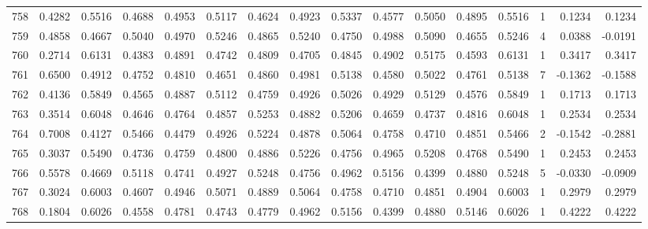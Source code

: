 \begin{tabular}{lrrrrrrrrrrrrrrr}
758 &      0.4282 &  0.5516 &  0.4688 &  0.4953 &  0.5117 &  0.4624 &  0.4923 &  0.5337 &  0.4577 &  0.5050 &   0.4895 &     0.5516 &      1 &                    0.1234 &                     0.1234 \\
759 &      0.4858 &  0.4667 &  0.5040 &  0.4970 &  0.5246 &  0.4865 &  0.5240 &  0.4750 &  0.4988 &  0.5090 &   0.4655 &     0.5246 &      4 &                    0.0388 &                    -0.0191 \\
760 &      0.2714 &  0.6131 &  0.4383 &  0.4891 &  0.4742 &  0.4809 &  0.4705 &  0.4845 &  0.4902 &  0.5175 &   0.4593 &     0.6131 &      1 &                    0.3417 &                     0.3417 \\
761 &      0.6500 &  0.4912 &  0.4752 &  0.4810 &  0.4651 &  0.4860 &  0.4981 &  0.5138 &  0.4580 &  0.5022 &   0.4761 &     0.5138 &      7 &                   -0.1362 &                    -0.1588 \\
762 &      0.4136 &  0.5849 &  0.4565 &  0.4887 &  0.5112 &  0.4759 &  0.4926 &  0.5026 &  0.4929 &  0.5129 &   0.4576 &     0.5849 &      1 &                    0.1713 &                     0.1713 \\
763 &      0.3514 &  0.6048 &  0.4646 &  0.4764 &  0.4857 &  0.5253 &  0.4882 &  0.5206 &  0.4659 &  0.4737 &   0.4816 &     0.6048 &      1 &                    0.2534 &                     0.2534 \\
764 &      0.7008 &  0.4127 &  0.5466 &  0.4479 &  0.4926 &  0.5224 &  0.4878 &  0.5064 &  0.4758 &  0.4710 &   0.4851 &     0.5466 &      2 &                   -0.1542 &                    -0.2881 \\
765 &      0.3037 &  0.5490 &  0.4736 &  0.4759 &  0.4800 &  0.4886 &  0.5226 &  0.4756 &  0.4965 &  0.5208 &   0.4768 &     0.5490 &      1 &                    0.2453 &                     0.2453 \\
766 &      0.5578 &  0.4669 &  0.5118 &  0.4741 &  0.4927 &  0.5248 &  0.4756 &  0.4962 &  0.5156 &  0.4399 &   0.4880 &     0.5248 &      5 &                   -0.0330 &                    -0.0909 \\
767 &      0.3024 &  0.6003 &  0.4607 &  0.4946 &  0.5071 &  0.4889 &  0.5064 &  0.4758 &  0.4710 &  0.4851 &   0.4904 &     0.6003 &      1 &                    0.2979 &                     0.2979 \\
768 &      0.1804 &  0.6026 &  0.4558 &  0.4781 &  0.4743 &  0.4779 &  0.4962 &  0.5156 &  0.4399 &  0.4880 &   0.5146 &     0.6026 &      1 &                    0.4222 &                     0.4222 \\

\end{tabular}
